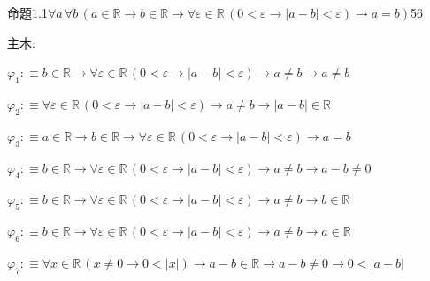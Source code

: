\begin{fullproof}{命題1.1}{$\forall a\,\forall b\,(a \in \mathbb{R} \to b \in \mathbb{R} \to \forall \varepsilon \in \mathbb{R}\,(0 < \varepsilon \to \lvert a - b \rvert < \varepsilon) \to a = b)$}{56}
\begin{ptree}
\noLine
{}
\end{ptree}
\noindent 主木:
\begin{ptree}
\noLine
{}
\noLine
{}
\end{ptree}
\begin{abbrevlist}
\item $\varphi_{1} :\equiv b \in \mathbb{R} \to \forall \varepsilon \in \mathbb{R}\,(0 < \varepsilon \to \lvert a - b \rvert < \varepsilon) \to a \neq b \to a \neq b$
\item $\varphi_{2} :\equiv \forall \varepsilon \in \mathbb{R}\,(0 < \varepsilon \to \lvert a - b \rvert < \varepsilon) \to a \neq b \to \lvert a - b \rvert \in \mathbb{R}$
\item $\varphi_{3} :\equiv a \in \mathbb{R} \to b \in \mathbb{R} \to \forall \varepsilon \in \mathbb{R}\,(0 < \varepsilon \to \lvert a - b \rvert < \varepsilon) \to a = b$
\item $\varphi_{4} :\equiv b \in \mathbb{R} \to \forall \varepsilon \in \mathbb{R}\,(0 < \varepsilon \to \lvert a - b \rvert < \varepsilon) \to a \neq b \to a - b \neq 0$
\item $\varphi_{5} :\equiv b \in \mathbb{R} \to \forall \varepsilon \in \mathbb{R}\,(0 < \varepsilon \to \lvert a - b \rvert < \varepsilon) \to a \neq b \to b \in \mathbb{R}$
\item $\varphi_{6} :\equiv b \in \mathbb{R} \to \forall \varepsilon \in \mathbb{R}\,(0 < \varepsilon \to \lvert a - b \rvert < \varepsilon) \to a \neq b \to a \in \mathbb{R}$
\item $\varphi_{7} :\equiv \forall x \in \mathbb{R}\,(x \neq 0 \to 0 < \lvert x \rvert) \to a - b \in \mathbb{R} \to a - b \neq 0 \to 0 < \lvert a - b \rvert$

\end{abbrevlist}
\end{fullproof}

